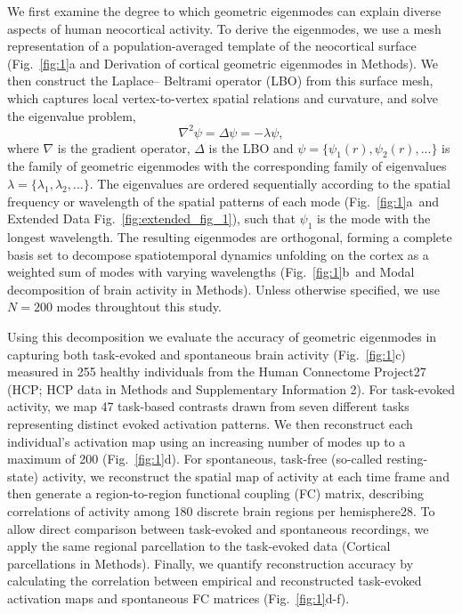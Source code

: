 \documentclass[sn-mathphys-num]{sn-jnl}%
\theoremstyle{thmstyleone}%
\theoremstyle{thmstyletwo}%
\theoremstyle{thmstylethree}%
\begin{document}
We first examine the degree to which geometric eigenmodes can explain diverse aspects of human neocortical activity. 
To derive the eigenmodes, we use a mesh representation of a population-averaged template of the neocortical surface (Fig.~\ref{fig:1}a and Derivation of cortical geometric eigenmodes in Methods). 
We then construct the Laplace– Beltrami operator (LBO) from this surface mesh, which captures local vertex-to-vertex spatial relations and curvature, and solve the eigenvalue problem,
\begin{equation} \label{eq:1}
	\nabla^2 \psi = \Delta\psi = -\lambda \psi,
\end{equation}
where $ \nabla $ is the gradient operator, $ \Delta $ is the LBO and $ \psi = \{\psi_1(r), \psi_2(r),...\} $ is the family of geometric eigenmodes with the corresponding family of eigenvalues $ \lambda = \{ \lambda_1, \lambda_2, ... \} $. 
The eigenvalues are ordered sequentially according to the spatial frequency or wavelength of the spatial patterns of each mode (Fig.~\ref{fig:1}a~and Extended Data Fig.~\ref{fig:extended_fig_1}), such that $ \psi_1 $ is the mode with the longest wavelength. 
The resulting eigenmodes are orthogonal, forming a complete basis set to decompose spatiotemporal dynamics unfolding on the cortex as a weighted sum of modes with varying wavelengths (Fig.~\ref{fig:1}b~and Modal decomposition of brain activity in Methods).
Unless otherwise specified, we use $ N=200 $ modes throughtout this study.


Using this decomposition we evaluate the accuracy of geometric eigenmodes in capturing both task-evoked and spontaneous brain activity (Fig.~\ref{fig:1}c) measured in 255 healthy individuals from the Human Connectome Project27 (HCP; HCP data in Methods and Supplementary Information 2). 
For task-evoked activity, we map 47 task-based contrasts drawn from seven different tasks representing distinct evoked activation patterns. 
We then reconstruct each individual’s activation map using an increasing number of modes up to a maximum of 200 (Fig.~\ref{fig:1}d). 
For spontaneous, task-free (so-called resting-state) activity, we reconstruct the spatial map of activity at each time frame and then generate a region-to-region functional coupling (FC) matrix, describing correlations of activity among 180 discrete brain regions per hemisphere28. 
To allow direct comparison between task-evoked and spontaneous recordings, we apply the same regional parcellation to the task-evoked data (Cortical parcellations in Methods). 
Finally, we quantify reconstruction accuracy by calculating the correlation between empirical and reconstructed task-evoked activation maps and spontaneous FC matrices (Fig.~\ref{fig:1}d-f).
\end{document}
